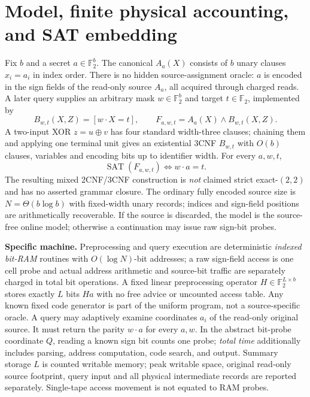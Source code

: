 \documentclass[10pt]{article}
\newcommand{\F}{\mathbb F_2}
\begin{document}
\section{Model, finite physical accounting, and SAT embedding}
Fix $b$ and a secret $a\in\F^b$. The canonical $A_a(X)$ consists of $b$ unary clauses $x_i=a_i$ in index order. There is no hidden source-assignment oracle: $a$ is encoded in the sign fields of the read-only source $A_a$, all acquired through charged reads. A later query supplies an arbitrary mask $w\in\F^b$ and target $t\in\F$, implemented by
\[
 B_{w,t}(X,Z)=[w\cdot X=t],\qquad
 F_{a,w,t}=A_a(X)\land B_{w,t}(X,Z).
\]
A two-input XOR $z=u\oplus v$ has four standard width-three clauses; chaining them and applying one terminal unit gives an existential 3CNF $B_{w,t}$ with $O(b)$ clauses, variables and encoding bits up to identifier width. For every $a,w,t$,
\begin{equation}\label{eq:sat}
 \operatorname{SAT}(F_{a,w,t})\iff w\cdot a=t.
\end{equation}
The resulting mixed 2CNF/3CNF construction is \emph{not} claimed strict exact-$(2,2)$ and has no asserted grammar closure. The ordinary fully encoded source size is $N=\Theta(b\log b)$ with fixed-width unary records; indices and sign-field positions are arithmetically recoverable. If the source is discarded, the model is the source-free online model; otherwise a continuation may issue raw sign-bit probes.

\noindent\textbf{Specific machine.} Preprocessing and query execution are deterministic \emph{indexed bit-RAM} routines with $O(\log N)$-bit addresses; a raw sign-field access is one cell probe and actual address arithmetic and source-bit traffic are separately charged in total bit operations. A fixed linear preprocessing operator $H\in\F^{L\times b}$ stores exactly $L$ bits $Ha$ with no free advice or uncounted access table. Any known fixed code generator is part of the uniform program, not a source-specific oracle. A query may adaptively examine coordinates $a_i$ of the read-only original source. It must return the parity $w\cdot a$ for every $a,w$. In the abstract bit-probe coordinate $Q$, reading a known sign bit counts one probe; \emph{total time} additionally includes parsing, address computation, code search, and output. Summary storage $L$ is counted writable memory; peak writable space, original read-only source footprint, query input and all physical intermediate records are reported separately. Single-tape access movement is not equated to RAM probes.
\end{document}

